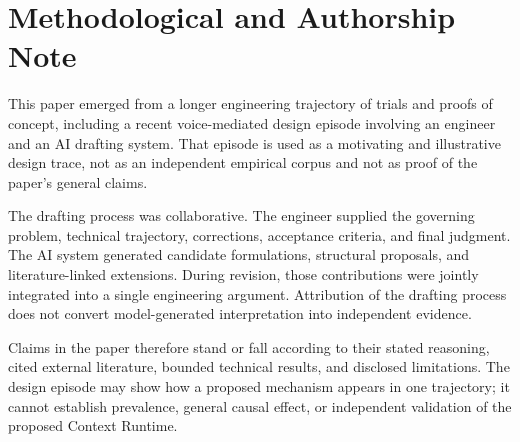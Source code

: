 \section*{Methodological and Authorship Note}

This paper emerged from a longer engineering trajectory of trials and proofs of concept, including a recent voice-mediated design episode involving an engineer and an AI drafting system. That episode is used as a motivating and illustrative design trace, not as an independent empirical corpus and not as proof of the paper's general claims.

The drafting process was collaborative. The engineer supplied the governing problem, technical trajectory, corrections, acceptance criteria, and final judgment. The AI system generated candidate formulations, structural proposals, and literature-linked extensions. During revision, those contributions were jointly integrated into a single engineering argument. Attribution of the drafting process does not convert model-generated interpretation into independent evidence.

Claims in the paper therefore stand or fall according to their stated reasoning, cited external literature, bounded technical results, and disclosed limitations. The design episode may show how a proposed mechanism appears in one trajectory; it cannot establish prevalence, general causal effect, or independent validation of the proposed Context Runtime.
